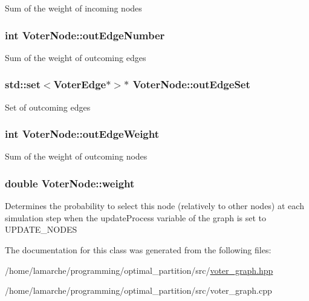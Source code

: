 Sum of the weight of incoming nodes \hypertarget{classVoterNode_ad02a5823353dd4f1e0a1b9965553a1ef}{
\subsubsection[{out\-Edge\-Number}]{\setlength{\rightskip}{0pt plus 5cm}int Voter\-Node\-::out\-Edge\-Number}}\label{classVoterNode_ad02a5823353dd4f1e0a1b9965553a1ef}
Sum of the weight of outcoming edges \hypertarget{classVoterNode_abbeb36b008f12217d080f9eb287ae9de}{
\subsubsection[{out\-Edge\-Set}]{\setlength{\rightskip}{0pt plus 5cm}std\-::set$<${\bf Voter\-Edge}$\ast$$>$$\ast$ Voter\-Node\-::out\-Edge\-Set}}\label{classVoterNode_abbeb36b008f12217d080f9eb287ae9de}
Set of outcoming edges \hypertarget{classVoterNode_ae092216c9048f14155b2e580236ab6a9}{
\subsubsection[{out\-Edge\-Weight}]{\setlength{\rightskip}{0pt plus 5cm}int Voter\-Node\-::out\-Edge\-Weight}}\label{classVoterNode_ae092216c9048f14155b2e580236ab6a9}
Sum of the weight of outcoming nodes \hypertarget{classVoterNode_a06aa43e2603a2c8ee7540c754ef1fce2}{
\subsubsection[{weight}]{\setlength{\rightskip}{0pt plus 5cm}double Voter\-Node\-::weight}}\label{classVoterNode_a06aa43e2603a2c8ee7540c754ef1fce2}
Determines the probability to select this node (relatively to other nodes) at each simulation step when the update\-Process variable of the graph is set to U\-P\-D\-A\-T\-E\-\_\-\-N\-O\-D\-E\-S 

The documentation for this class was generated from the following files\-:\begin{DoxyCompactItemize}
\item 
/home/lamarche/programming/optimal\-\_\-partition/src/\hyperlink{voter__graph_8hpp}{voter\-\_\-graph.\-hpp}\item 
/home/lamarche/programming/optimal\-\_\-partition/src/voter\-\_\-graph.\-cpp\end{DoxyCompactItemize}
